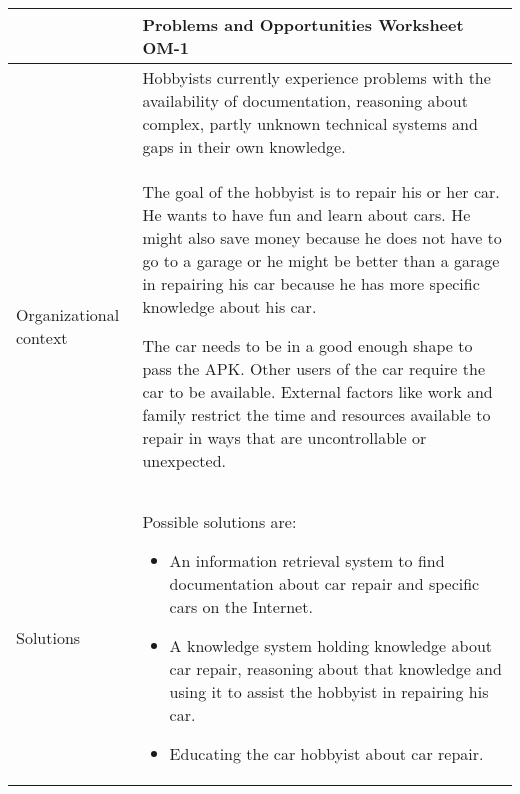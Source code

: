 \noindent
\begin{tabular}{|>{\colleft}p{3cm}|>{\colleft}p{10cm}|}
\hline
{\bf Organization Model} &
   {\bf Problems and Opportunities Worksheet OM-1} \\
\hline
\hline
{\sc Problems and opportunities} &
Hobbyists currently experience problems with the availability of documentation,
reasoning about complex, partly unknown technical systems and gaps in their own
knowledge.
\\ \hline
{\sc Organizational context} &
The goal of the hobbyist is to repair his or her car. He wants to have fun and
learn about cars. He might also save money because he does not have to go to a
garage or he might be better than a garage in repairing his car because he has 
more specific knowledge about his car.

The car needs to be in a good enough shape to pass the APK. Other users of the
car require the car to be available. External factors like work and family restrict the time and resources available to repair in ways that are uncontrollable or unexpected.
\\ \hline

{\sc Solutions} &
Possible solutions are:
\begin{itemize}
	\item An information retrieval system to find documentation about car repair and
specific cars on the Internet. 
	\item A knowledge system holding knowledge about car repair, reasoning about that
knowledge and using it to assist the hobbyist in repairing his car. 
	\item Educating the car hobbyist about car repair.
\end{itemize}
\\ \hline
\end{tabular}
